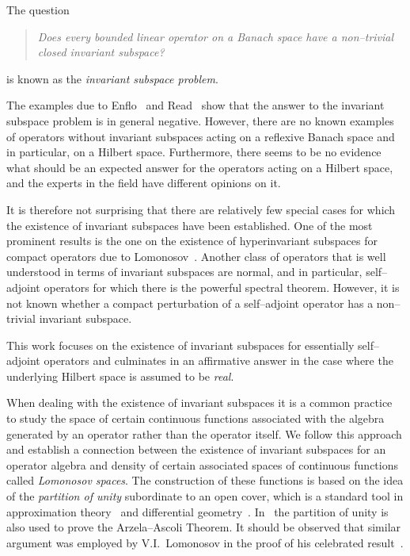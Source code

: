 

The question
\begin{quote}
  {\em Does every bounded linear operator on a Banach space have a
  non--trivial closed invariant subspace? }
\end{quote}
is known as the {\em invariant subspace problem}.

\medskip

The examples due to Enflo~\cite{Enf87} and Read~\cite{Rea85} show that the
answer to the invariant subspace problem is in general negative. However,
there are no known examples of operators without invariant subspaces acting
on a reflexive Banach space and in particular, on a Hilbert space.
Furthermore, there seems to be no evidence what should be an expected answer
for the operators acting on a Hilbert space, and the experts in the field
have different opinions on it.

It is therefore not surprising that there are relatively few special cases
for which the existence of invariant subspaces have been established. One of
the most prominent results is the one on the existence of hyperinvariant
subspaces for compact operators due to Lomonosov~\cite{Lom73,RR73}. Another
class of operators that is well understood in terms of invariant subspaces
are normal, and in particular, self--adjoint operators for which there is the
powerful spectral theorem. However, it is not known whether a compact
perturbation of a self--adjoint operator has a non--trivial invariant
subspace.

This work focuses on the existence of invariant subspaces for essentially
self--adjoint operators and culminates in an affirmative answer in the case
where the underlying Hilbert space is assumed to be {\em real}.

\medskip

When dealing with the existence of invariant subspaces it is a common
practice~\cite{AAB95,dB93,Lom91} to study the space of certain continuous
functions associated with the algebra generated by an operator rather than
the operator itself. We follow this approach and establish a connection
between the existence of invariant subspaces for an operator algebra and
density of certain associated spaces of continuous functions called {\em
Lomonosov spaces}. The construction of these functions is based on the idea
of the {\em partition of unity} subordinate to an open cover, which is a
standard tool in approximation theory~\cite{Gam90} and differential
geometry~\cite{Dev68,Spi65}. In~\cite{Dev68} the partition of unity is also
used to prove the Arzela--Ascoli Theorem. It should be observed that similar
argument was employed by V.I.~Lomonosov in the proof of his celebrated
result~\cite{Lom73}.

